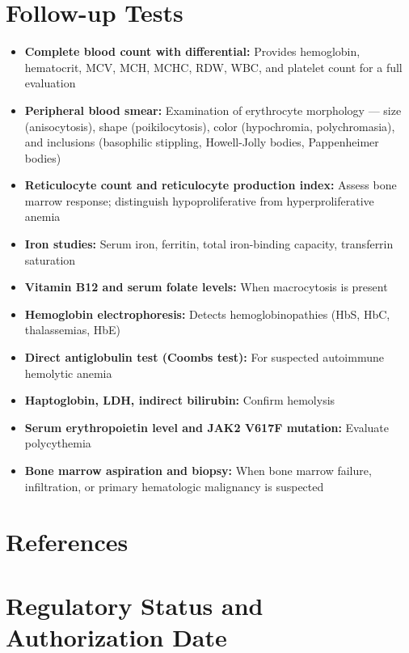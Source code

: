 \section*{Follow-up Tests}
\begin{itemize}
  \item \textbf{Complete blood count with differential:} Provides hemoglobin, hematocrit, MCV, MCH, MCHC, RDW, WBC, and platelet count for a full evaluation
  \item \textbf{Peripheral blood smear:} Examination of erythrocyte morphology --- size (anisocytosis), shape (poikilocytosis), color (hypochromia, polychromasia), and inclusions (basophilic stippling, Howell-Jolly bodies, Pappenheimer bodies)
  \item \textbf{Reticulocyte count and reticulocyte production index:} Assess bone marrow response; distinguish hypoproliferative from hyperproliferative anemia
  \item \textbf{Iron studies:} Serum iron, ferritin, total iron-binding capacity, transferrin saturation
  \item \textbf{Vitamin B12 and serum folate levels:} When macrocytosis is present
  \item \textbf{Hemoglobin electrophoresis:} Detects hemoglobinopathies (HbS, HbC, thalassemias, HbE)
  \item \textbf{Direct antiglobulin test (Coombs test):} For suspected autoimmune hemolytic anemia
  \item \textbf{Haptoglobin, LDH, indirect bilirubin:} Confirm hemolysis
  \item \textbf{Serum erythropoietin level and JAK2 V617F mutation:} Evaluate polycythemia
  \item \textbf{Bone marrow aspiration and biopsy:} When bone marrow failure, infiltration, or primary hematologic malignancy is suspected
\end{itemize}

\section*{References}



\clearpage
\section*{Regulatory Status and Authorization Date}

\clearpage
